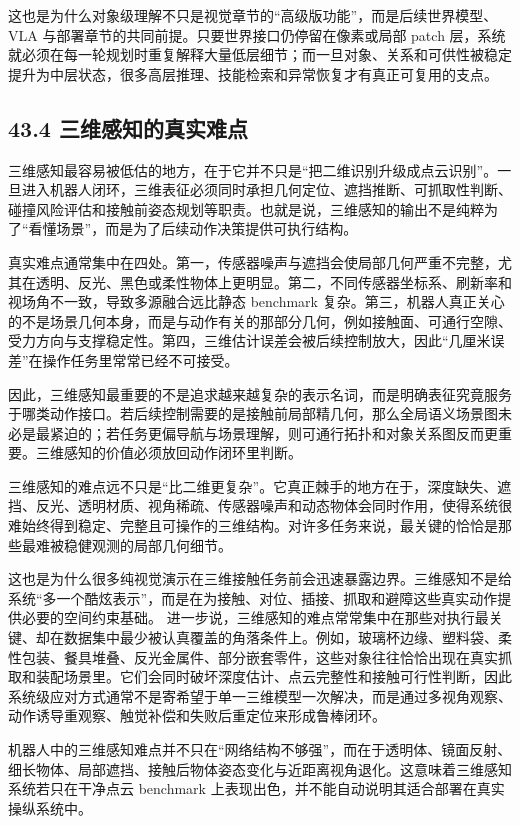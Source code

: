 这也是为什么对象级理解不只是视觉章节的“高级版功能”，而是后续世界模型、VLA 与部署章节的共同前提。只要世界接口仍停留在像素或局部 patch 层，系统就必须在每一轮规划时重复解释大量低层细节；而一旦对象、关系和可供性被稳定提升为中层状态，很多高层推理、技能检索和异常恢复才有真正可复用的支点。

\subsection*{43.4 三维感知的真实难点}


三维感知最容易被低估的地方，在于它并不只是“把二维识别升级成点云识别”。一旦进入机器人闭环，三维表征必须同时承担几何定位、遮挡推断、可抓取性判断、碰撞风险评估和接触前姿态规划等职责。也就是说，三维感知的输出不是纯粹为了“看懂场景”，而是为了后续动作决策提供可执行结构。

真实难点通常集中在四处。第一，传感器噪声与遮挡会使局部几何严重不完整，尤其在透明、反光、黑色或柔性物体上更明显。第二，不同传感器坐标系、刷新率和视场角不一致，导致多源融合远比静态 benchmark 复杂。第三，机器人真正关心的不是场景几何本身，而是与动作有关的那部分几何，例如接触面、可通行空隙、受力方向与支撑稳定性。第四，三维估计误差会被后续控制放大，因此“几厘米误差”在操作任务里常常已经不可接受。

因此，三维感知最重要的不是追求越来越复杂的表示名词，而是明确表征究竟服务于哪类动作接口。若后续控制需要的是接触前局部精几何，那么全局语义场景图未必是最紧迫的；若任务更偏导航与场景理解，则可通行拓扑和对象关系图反而更重要。三维感知的价值必须放回动作闭环里判断。

三维感知的难点远不只是“比二维更复杂”。它真正棘手的地方在于，深度缺失、遮挡、反光、透明材质、视角稀疏、传感器噪声和动态物体会同时作用，使得系统很难始终得到稳定、完整且可操作的三维结构。对许多任务来说，最关键的恰恰是那些最难被稳健观测的局部几何细节。

这也是为什么很多纯视觉演示在三维接触任务前会迅速暴露边界。三维感知不是给系统“多一个酷炫表示”，而是在为接触、对位、插接、抓取和避障这些真实动作提供必要的空间约束基础。 进一步说，三维感知的难点常常集中在那些对执行最关键、却在数据集中最少被认真覆盖的角落条件上。例如，玻璃杯边缘、塑料袋、柔性包装、餐具堆叠、反光金属件、部分嵌套零件，这些对象往往恰恰出现在真实抓取和装配场景里。它们会同时破坏深度估计、点云完整性和接触可行性判断，因此系统级应对方式通常不是寄希望于单一三维模型一次解决，而是通过多视角观察、动作诱导重观察、触觉补偿和失败后重定位来形成鲁棒闭环。

机器人中的三维感知难点并不只在“网络结构不够强”，而在于透明体、镜面反射、细长物体、局部遮挡、接触后物体姿态变化与近距离视角退化。这意味着三维感知系统若只在干净点云 benchmark 上表现出色，并不能自动说明其适合部署在真实操纵系统中。

